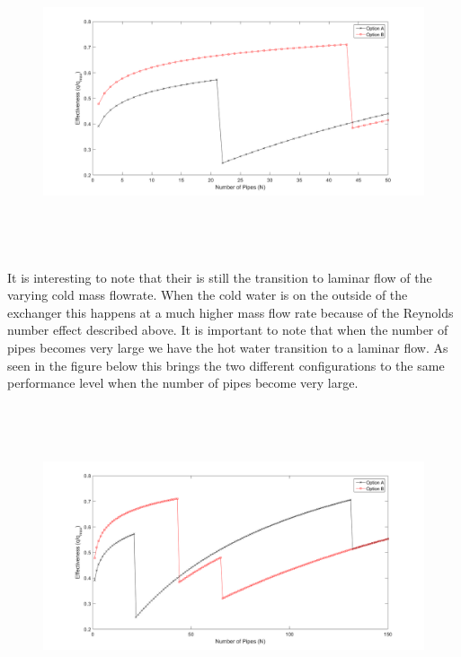 %
\begin{figure}[H]
    \centering
    \includegraphics[height=3.5in]{pictures/part_4_eff_050.png}
\end{figure}
%
\noindent
It is interesting to note that their is still the transition to laminar flow of the varying cold mass flowrate. When the cold water is on the outside of the exchanger this happens at a much higher mass flow rate because of the Reynolds number effect described above. It is important to note that when the number of pipes becomes very large we have the hot water transition to a laminar flow. As seen in the figure below this brings the two different configurations to the same performance level when the number of pipes become very large.
%
\begin{figure}[H]
    \centering
    \includegraphics[height=3.5in]{pictures/part_4_eff_150.png}
\end{figure}
